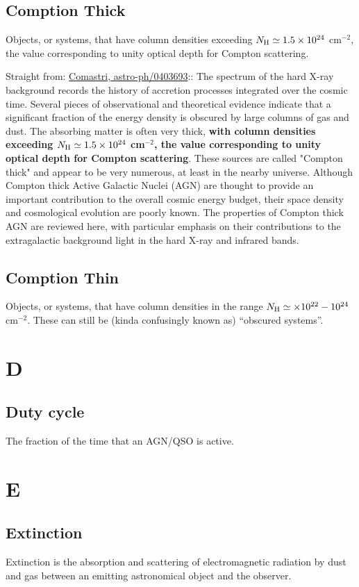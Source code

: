 \documentclass[11pt]{article}
\begin{document}
\subsection*{Comption Thick}
Objects, or systems, that have column densities exceeding $N_{\rm H}
\simeq 1.5 \times 10^{24}$ cm$^{-2}$, the value corresponding to unity
optical depth for Compton scattering.

Straight from: \href{http://ned.ipac.caltech.edu/level5/March04/Comastri/frames.html}{Comastri,  astro-ph/0403693}::
The spectrum of the hard X-ray background records the history of
accretion processes integrated over the cosmic time. Several pieces of
observational and theoretical evidence indicate that a significant
fraction of the energy density is obscured by large columns of gas and
dust. The absorbing matter is often very thick, {\bf with column
densities exceeding $N_{\rm H} \simeq 1.5 \times10^{24}$ cm$^{-2}$,
the value corresponding to unity optical depth for Compton
scattering}. These sources are called "Compton thick" and appear to be
very numerous, at least in the nearby universe. Although Compton thick
Active Galactic Nuclei (AGN) are thought to provide an important
contribution to the overall cosmic energy budget, their space density
and cosmological evolution are poorly known. The properties of Compton
thick AGN are reviewed here, with particular emphasis on their
contributions to the extragalactic background light in the hard X-ray
and infrared bands.

\subsection*{Comption Thin}
Objects, or systems, that have column densities in the range $N_{\rm H}
\simeq \times 10^{22} - 10^{24}$ cm$^{-2}$. These can still be 
(kinda confusingly known as) ``obscured systems''. 

    
\section*{D}
    \subsection*{Duty cycle}
    The fraction of the time that an AGN/QSO is active.

\section*{E}
    \subsection*{Extinction}
    Extinction is the absorption and scattering of electromagnetic
radiation by dust and gas between an emitting astronomical object and
the observer.
\end{document}
